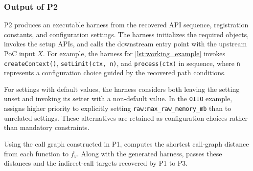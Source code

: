 \subsubsection{Output of P2}
P2 produces an executable harness from the recovered API sequence, registration constants, and configuration settings.
The harness initializes the required objects, invokes the setup APIs, and calls the downstream entry point with the upstream PoC input $X$.
%
For example, the harness for \autoref{lst:working_example} invokes \texttt{createContext()}, \texttt{setLimit(ctx, n)}, and \texttt{process(ctx)} in sequence, where \texttt{n} represents a configuration choice guided by the recovered path conditions.
%

For settings with default values, the harness considers both leaving the setting unset and invoking its setter with a non-default value.
In the \texttt{OIIO} example, \sys assigns higher priority to explicitly setting \texttt{raw:max\_raw\_memory\_mb} than to unrelated settings.
These alternatives are retained as configuration choices rather than mandatory constraints.
%

Using the call graph constructed in P1, \sys computes the shortest call-graph distance from each function to $f_v$.
Along with the generated harness, \sys passes these distances and the indirect-call targets recovered by P1 to P3.




